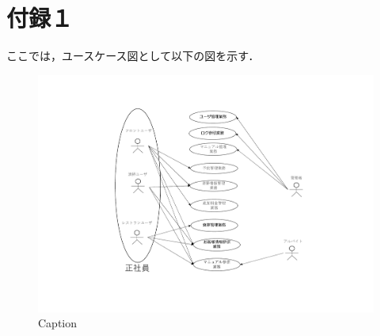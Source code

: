 
\section{付録１}
ここでは，ユースケース図として以下の図を示す．
\begin{figure}
    \centering
    \includegraphics[scale = 0.4]{fib/usecase.pdf}
    \caption{Caption}
    \label{fig:go}
\end{figure}


